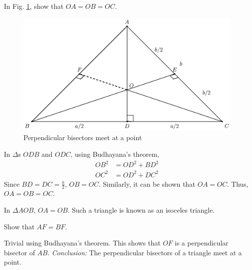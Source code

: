 \begin{problem}
	In Fig. \ref{ch3_perp_bisector}, show that $OA=OB=OC$.
\end{problem}
\begin{figure}[!h]
	\begin{center}
		
		\includegraphics[width=\columnwidth]{./figs/fig_3.8.eps}
	\end{center}
	\caption{Perpendicular bisectors meet at a point}
	\label{ch3_perp_bisector}	
\end{figure}
%
\proof In $\Delta$s $ODB$ and $ODC$, using Budhayana's theorem,
%
\begin{equation}
\begin{split}
OB^2 &= OD^2 + BD^2 \\
OC^2 &= OD^2 + DC^2 
\end{split}
\end{equation}
%
Since $BD = DC = \frac{a}{2}$, $OB = OC$.  Similarly, it can be shown that $OA = OC$.  Thus, $OA=OB=OC$.
%
\begin{definition}
	In $\Delta AOB$, $OA = OB$.  Such a triangle is known as an isoceles triangle.
\end{definition}
%
\begin{problem}
	Show that $AF = BF$.
\end{problem}
\proof Trivial using Budhayana's theorem.  This shows that $OF$ is a perpendicular bisector of $AB$. 
{\em Conclusion:}  The perpendicular bisectors of a triangle meet at a point.
%

